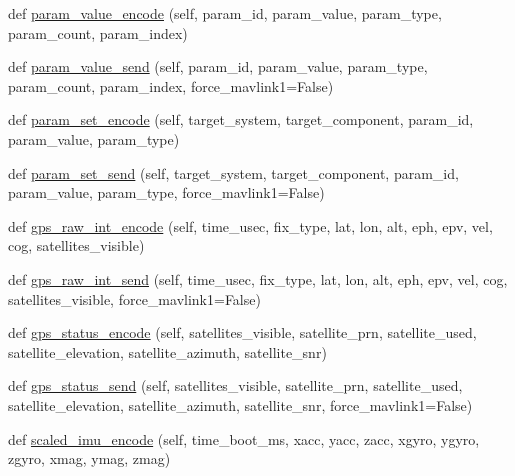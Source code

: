 \begin{DoxyCompactItemize}
\item 
def \hyperlink{classpymavlink_1_1dialects_1_1v10_1_1MAVLink_a445f3537b7801e8d8d109916c9190bfe}{param\+\_\+value\+\_\+encode} (self, param\+\_\+id, param\+\_\+value, param\+\_\+type, param\+\_\+count, param\+\_\+index)
\item 
def \hyperlink{classpymavlink_1_1dialects_1_1v10_1_1MAVLink_ae8b8d1ad6232b25a83ce39930b54f4a5}{param\+\_\+value\+\_\+send} (self, param\+\_\+id, param\+\_\+value, param\+\_\+type, param\+\_\+count, param\+\_\+index, force\+\_\+mavlink1=False)
\item 
def \hyperlink{classpymavlink_1_1dialects_1_1v10_1_1MAVLink_a935cd20d3f8459fb4405ca08f89e3ed0}{param\+\_\+set\+\_\+encode} (self, target\+\_\+system, target\+\_\+component, param\+\_\+id, param\+\_\+value, param\+\_\+type)
\item 
def \hyperlink{classpymavlink_1_1dialects_1_1v10_1_1MAVLink_a68ef1752d9707f3eb7a60c4bc5583086}{param\+\_\+set\+\_\+send} (self, target\+\_\+system, target\+\_\+component, param\+\_\+id, param\+\_\+value, param\+\_\+type, force\+\_\+mavlink1=False)
\item 
def \hyperlink{classpymavlink_1_1dialects_1_1v10_1_1MAVLink_a9a6a6ffb325e3fcdeaeb6a962b310388}{gps\+\_\+raw\+\_\+int\+\_\+encode} (self, time\+\_\+usec, fix\+\_\+type, lat, lon, alt, eph, epv, vel, cog, satellites\+\_\+visible)
\item 
def \hyperlink{classpymavlink_1_1dialects_1_1v10_1_1MAVLink_a380392f2d25c410f2dedc9d02bddf488}{gps\+\_\+raw\+\_\+int\+\_\+send} (self, time\+\_\+usec, fix\+\_\+type, lat, lon, alt, eph, epv, vel, cog, satellites\+\_\+visible, force\+\_\+mavlink1=False)
\item 
def \hyperlink{classpymavlink_1_1dialects_1_1v10_1_1MAVLink_a66cec6328cd99817e8aa5a8f6cd44f28}{gps\+\_\+status\+\_\+encode} (self, satellites\+\_\+visible, satellite\+\_\+prn, satellite\+\_\+used, satellite\+\_\+elevation, satellite\+\_\+azimuth, satellite\+\_\+snr)
\item 
def \hyperlink{classpymavlink_1_1dialects_1_1v10_1_1MAVLink_ad019cee795d82995114c9a80b7f3aa0a}{gps\+\_\+status\+\_\+send} (self, satellites\+\_\+visible, satellite\+\_\+prn, satellite\+\_\+used, satellite\+\_\+elevation, satellite\+\_\+azimuth, satellite\+\_\+snr, force\+\_\+mavlink1=False)
\item 
def \hyperlink{classpymavlink_1_1dialects_1_1v10_1_1MAVLink_a09724d5e708e45a67bd07253f898839f}{scaled\+\_\+imu\+\_\+encode} (self, time\+\_\+boot\+\_\+ms, xacc, yacc, zacc, xgyro, ygyro, zgyro, xmag, ymag, zmag)

\end{DoxyCompactItemize}
